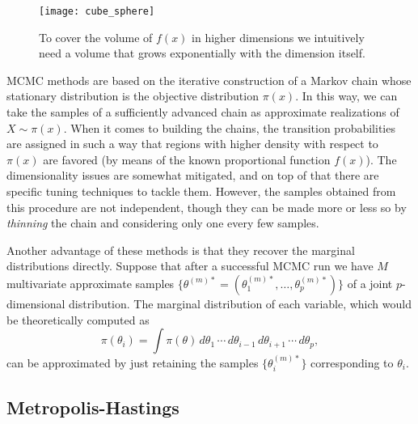 \vspace{1em}

\begin{figure}[ht!]
  \centering
  \texttt{[image: cube\_sphere]}
  \caption{To cover the volume of \(f(x)\) in higher dimensions we intuitively need a volume that grows exponentially with the dimension itself.}\label{fig:curse_dimensionality}
\end{figure}

MCMC methods are based on the iterative construction of a Markov chain whose stationary distribution is the objective distribution \(\pi(x)\). In this way, we can take the samples of a sufficiently advanced chain as approximate realizations of \(X\sim \pi(x)\). When it comes to building the chains, the transition probabilities are assigned in such a way that regions with higher density with respect to \(\pi(x)\) are favored (by means of the known proportional function \(f(x)\)). The dimensionality issues are somewhat mitigated, and on top of that there are specific tuning techniques to tackle them. However, the samples obtained from this procedure are not independent, though they can be made more or less so by \textit{thinning} the chain and considering only one every few samples.

Another advantage of these methods is that they recover the marginal distributions directly. Suppose that after a successful MCMC run we have \(M\) multivariate approximate samples \(\{\theta^{(m)*}=(\theta_1^{(m)*},\dots, \theta_p^{(m)*})\}\) of a joint \(p\)-dimensional distribution. The marginal distribution of each variable, which would be theoretically computed as
\[
\pi(\theta_i) = \int \pi(\theta)\,d\theta_1\,\cdots\,d\theta_{i-1}\,d\theta_{i+1}\,\cdots \,d\theta_p,
\]
can be approximated by just retaining the samples \(\{\theta_i^{(m)*}\}\) corresponding to \(\theta_i\).

\subsection*{Metropolis-Hastings}

